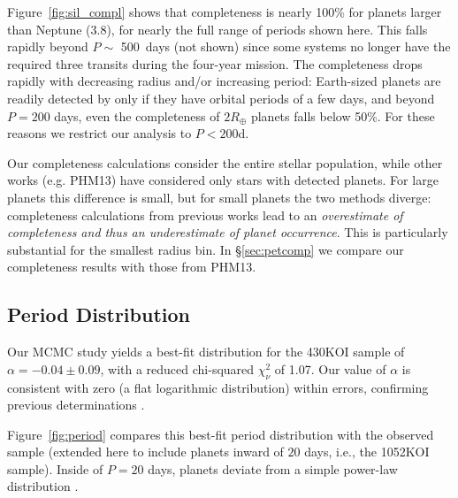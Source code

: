 Figure~\ref{fig:sil_compl} shows that \kep{} completeness is nearly 100\% 
for planets larger than
Neptune (3.8\rearth{}), for nearly the full range of periods shown
here. This falls rapidly beyond $P \sim $ 500~days (not shown)
since some systems no longer have the required three
transits during the four-year \kep{} mission. The completeness
drops rapidly with decreasing radius and/or increasing period:
Earth-sized planets are readily detected by \kep{} only if they have
orbital periods of a few days, and beyond $P=200$ days, even the
completeness of $2 R_\oplus$ planets falls below 50\%. For these
reasons we restrict our analysis to $P < 200$d.  

Our completeness calculations consider the entire stellar population,
while other works (e.g. PHM13) have considered only stars with
detected planets. For large planets this difference is small, but for
small planets the two methods diverge: completeness calculations from previous
works lead to an {\it overestimate of completeness and thus an
  underestimate of planet occurrence}. This is particularly
substantial for the smallest radius bin. In \S \ref{sec:petcomp} 
we compare our completeness results with those from PHM13.

\subsection{Period Distribution}
\label{sec:intperiod}

Our MCMC study yields a best-fit distribution for the 430KOI sample of
$\alpha=-0.04 \pm 0.09$, with a reduced chi-squared $\chi^2_{\nu}$ of
1.07. Our value of $\alpha$ is consistent with zero (a flat
logarithmic distribution) within errors, confirming previous
determinations \citep[e.g.,][]{Youdin,Howard2012,Petigura2013,Fressin2013}.

Figure~\ref{fig:period} compares this best-fit period distribution
with the observed sample (extended here to include planets inward of
$20$ days, i.e., the 1052KOI sample). Inside of $P = 20$ days, \kep{}
planets deviate from a simple power-law distribution \citep[also
see][]{Youdin,Howard2012}.

